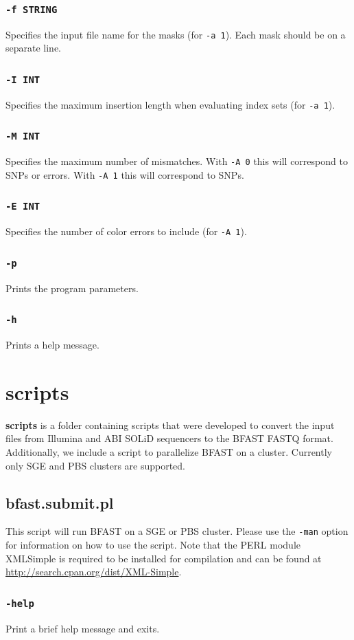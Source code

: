 \documentclass[a4paper,12pt]{book}
\newcommand{\TT}[1]{{\tt #1}} %
\newcommand{\BF}[1]{{\bf #1}} %
\begin{document}
\subsubsection{\TT{-f STRING}}
Specifies the input file name for the masks (for \TT{-a 1}).
Each mask should be on a separate line.
\subsubsection{\TT{-I INT}}
Specifies the maximum insertion length when evaluating index sets (for \TT{-a 1}).
\subsubsection{\TT{-M INT}}
Specifies the maximum number of mismatches.
With \TT{-A 0} this will correspond to SNPs or errors.
With \TT{-A 1} this will correspond to SNPs.
\subsubsection{\TT{-E INT}}
Specifies the number of color errors to include (for \TT{-A 1}).
\subsubsection{\TT{-p}}
Prints the program parameters.
\subsubsection{\TT{-h}}
Prints a help message.
\section{scripts}
\label{sec:scripts}
\BF{scripts} is a folder containing scripts that were developed to convert the input files from Illumina and ABI SOLiD sequencers to the BFAST FASTQ format.
Additionally, we include a script to parallelize BFAST on a cluster.
Currently only SGE and PBS clusters are supported.

\subsection{bfast.submit.pl}
This script will run BFAST on a SGE or PBS cluster.
Please use the \TT{-man} option for information on how to use the script.
Note that the PERL module XML\:\:Simple is required to be installed for compilation and can be found at \url{http://search.cpan.org/dist/XML-Simple}.
\subsubsection{\TT{-help}}
Print a brief help message and exits.
\end{document}
